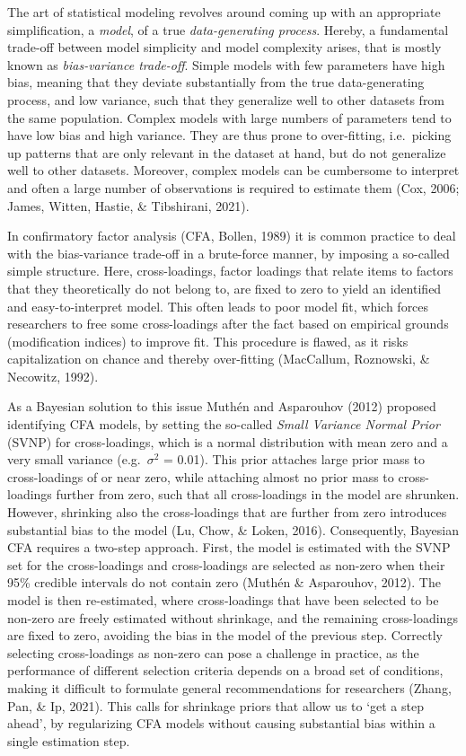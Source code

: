 \documentclass[
  man, donotrepeattitle,floatsintext]{apa6}
\begin{document}
The art of statistical modeling revolves around coming up with an appropriate simplification, a \emph{model}, of a true \emph{data-generating process}. Hereby, a fundamental trade-off between model simplicity and model complexity arises, that is mostly known as \emph{bias-variance trade-off}. Simple models with few parameters have high bias, meaning that they deviate substantially from the true data-generating process, and low variance, such that they generalize well to other datasets from the same population. Complex models with large numbers of parameters tend to have low bias and high variance. They are thus prone to over-fitting, i.e.~picking up patterns that are only relevant in the dataset at hand, but do not generalize well to other datasets. Moreover, complex models can be cumbersome to interpret and often a large number of observations is required to estimate them (Cox, 2006; James, Witten, Hastie, \& Tibshirani, 2021).

In confirmatory factor analysis (CFA, Bollen, 1989) it is common practice to deal with the bias-variance trade-off in a brute-force manner, by imposing a so-called simple structure. Here, cross-loadings, factor loadings that relate items to factors that they
theoretically do not belong to, are fixed to zero to yield an identified and easy-to-interpret model. This often leads to poor model fit, which forces researchers to free some cross-loadings after the fact based on empirical grounds (modification indices) to improve fit. This procedure is flawed, as it risks capitalization on chance and thereby over-fitting (MacCallum, Roznowski, \& Necowitz, 1992).

As a Bayesian solution to this issue Muthén and Asparouhov (2012) proposed identifying CFA models, by setting the so-called \emph{Small Variance Normal Prior} (SVNP) for cross-loadings, which is a normal distribution with mean zero and a very small variance (e.g.~\(\sigma^2\) = 0.01). This prior attaches large prior mass to cross-loadings of or near zero, while attaching almost no prior mass to cross-loadings further from zero, such that all cross-loadings in the model are shrunken. However, shrinking also the cross-loadings that are further from zero introduces substantial bias to the model (Lu, Chow, \& Loken, 2016). Consequently, Bayesian CFA requires a two-step approach. First, the model is estimated with the SVNP set for the cross-loadings and cross-loadings are selected as non-zero when their 95\% credible intervals do not contain zero (Muthén \& Asparouhov, 2012). The model is then re-estimated, where cross-loadings that have been selected to be non-zero are freely estimated without shrinkage, and the remaining cross-loadings are fixed to zero, avoiding the bias in the model of the previous step. Correctly selecting cross-loadings as non-zero can pose a challenge in practice, as the performance of different selection criteria depends on a broad set of conditions, making it difficult to formulate general recommendations for researchers (Zhang, Pan, \& Ip, 2021). This calls for shrinkage priors that allow us to `get a step ahead', by regularizing CFA models without causing substantial bias within a single estimation step.
\end{document}
